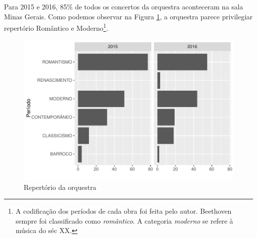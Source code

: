 \documentclass[a4paper, 12pt, openright, oneside, german, french, english, brazil]{abntex2}
\begin{document}
	
	
	Para 2015 e 2016, 85\% de todos os concertos da orquestra aconteceram na sala Minas Gerais. Como podemos observar na Figura \ref{repertoire-peryear}, a orquestra parece privilegiar repertório Romântico e Moderno\footnote{A codificação dos períodos de cada obra foi feita pelo autor. Beethoven sempre foi classificado como \textit{romântico}. A categoria \textit{moderno} se refere à música do séc XX.}.
	
	\begin{figure}[!h]
		\centering
		\caption{Repertório da orquestra}
		\label{repertoire-peryear}
		\includegraphics[scale=1]{periodo_peryear.pdf}
	\end{figure}
	
	
	
\end{document}
